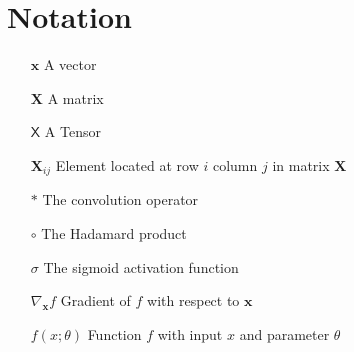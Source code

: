 \documentclass[./main.tex]{subfiles}
\begin{document}
\section*{Notation}
\begin{itemize}[leftmargin=2.0cm,labelsep=0.5cm]
    \item[$\bm{x}$] A vector
    \item[$\bm{X}$] A matrix
    \item[$\mathsf{X}$] A Tensor 
    \item[$\bm{X}_{ij}$] Element located at row $i$ column $j$ in matrix $\bm{X}$
    \item[$*$] The convolution operator
    \item[$\circ$] The Hadamard product  
    \item[$\sigma$] The sigmoid activation function 
    \item[$\nabla_{\bm{x}} f$] Gradient of $f$ with respect to $\bm{x}$
    \item[$f(x; \theta)$] Function $f$ with input $x$ and parameter $\theta$
\end{itemize}
\end{document}
